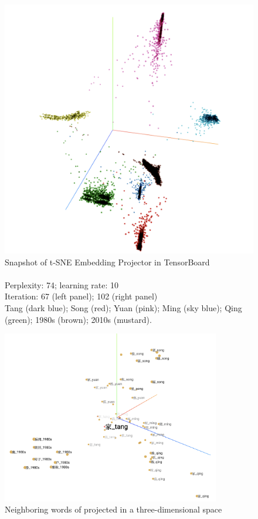 \begin{figure}[H]
\begin{minipage}[b]{0.45\linewidth}
    \includegraphics[width=\textwidth]{figures_new/from_old/tsne_embedding_projector_102}
  \end{minipage}
  \caption[Snapshot of t-SNE Embedding Projector in TensorBoard]%
  {Snapshot of t-SNE Embedding Projector in TensorBoard\\%
    \footnotesize{\\\text{*} Perplexity: 74; learning rate: 10\\Iteration: 67 (left panel); 102 (right panel)\\\text{*} Tang (dark blue); Song (red); Yuan (pink); Ming (sky blue); Qing (green); 1980s (brown); 2010s (mustard).}}
\end{figure}

\begin{figure}[H]
  \centering
  \includegraphics[height=0.45\textheight,width=0.85\textwidth,keepaspectratio]{figures_new/from_old/jia_neighboring_words}
  \caption{Neighboring words of \jia projected in a three-dimensional space}
  \label{fig:jia_neighboring_words}
\end{figure}

